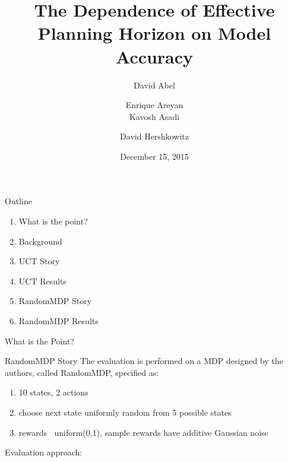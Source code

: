 \documentclass{beamer}
\title[The Dependence of Planning Horizon on Model Accuracy]{The Dependence of Effective Planning Horizon on Model Accuracy}
\author[]{David Abel  \and Enrique Areyan \\ Kavosh Asadi  \and David Hershkowitz}
\date{December 15, 2015}
\begin{document}
\begin{frame}
\titlepage
\end{frame}

\begin{frame}{Outline}
\begin{enumerate}
	\item What is the point?
	\item Background
	\item UCT Story
	\item UCT Results
	\item RandomMDP Story
	\item RandomMDP Results
\end{enumerate}
\end{frame}

\begin{frame}{What is the Point?}

\end{frame}


\begin{frame}{RandomMDP Story}
The evaluation is performed on a MDP designed by the authors, called RandomMDP, specified as:
\begin{enumerate}
\item 10 states, 2 actions
\item choose next state uniformly random from 5 possible states
\item rewards $~$ uniform(0,1), sample rewards have additive Gaussian noise
\end{enumerate}
Evaluation approach:


\end{frame}
\end{document}
